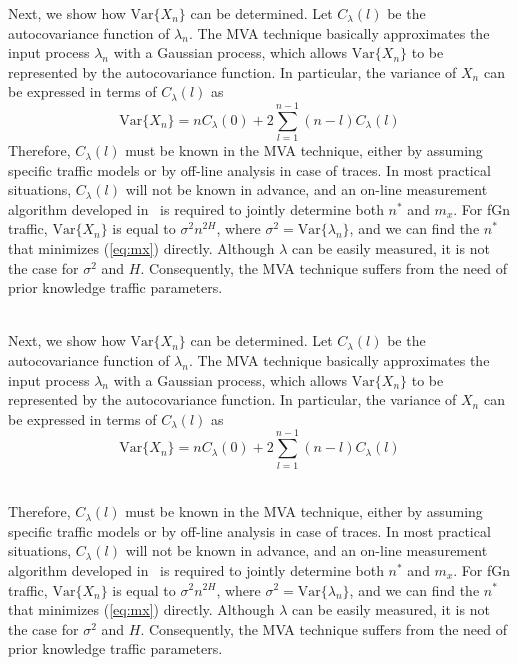 \documentclass[12pt,oneside,openright,a4paper]{cpe-thai-project}
\begin{document}
Next, we show how $\mathrm{Var}\{X_n\}$ can be determined.  Let
$C_{\lambda}(l)$ be the autocovariance function of $\lambda_n$.  The
MVA technique basically approximates the input process $\lambda_n$
with a Gaussian process, which allows $\mathrm{Var}\{X_n\}$ to be
represented by the autocovariance function.  In particular, the
variance of $X_n$ can be expressed in terms of $C_{\lambda}(l)$ as
\begin{equation}
  \mathrm{Var}\{X_n\} = nC_{\lambda}(0) + 2\sum_{l=1}^{n-1} (n-l)C_{\lambda}(l)
\end{equation} 
Therefore, $C_{\lambda}(l)$ must be known in the MVA technique, either
by assuming specific traffic models or by off-line analysis in case of
traces.  In most practical situations, $C_{\lambda}(l)$ will not be
known in advance, and an on-line measurement algorithm developed
in~\cite{eun01} is required to jointly determine both $n^\ast$ and
$m_x$. For fGn traffic, $\mathrm{Var}\{X_n\}$ is equal to $\sigma^2
n^{2H}$, where $\sigma^2 = \mathrm{Var}\{\lambda_n\}$, and we can find
the $n^\ast$ that minimizes (\ref{eq:mx}) directly. Although $\lambda$
can be easily measured, it is not the case for $\sigma^2$ and $H$.
Consequently, the MVA technique suffers from the need of prior
knowledge traffic parameters.


 \\

Next, we show how $\mathrm{Var}\{X_n\}$ can be determined.  Let
$C_{\lambda}(l)$ be the autocovariance function of $\lambda_n$.  The
MVA technique basically approximates the input process $\lambda_n$
with a Gaussian process, which allows $\mathrm{Var}\{X_n\}$ to be
represented by the autocovariance function.  In particular, the
variance of $X_n$ can be expressed in terms of $C_{\lambda}(l)$ as
\begin{equation}
  \mathrm{Var}\{X_n\} = nC_{\lambda}(0) + 2\sum_{l=1}^{n-1} (n-l)C_{\lambda}(l)
\end{equation} 

 \\

Therefore, $C_{\lambda}(l)$ must be known in the MVA technique, either
by assuming specific traffic models or by off-line analysis in case of
traces.  In most practical situations, $C_{\lambda}(l)$ will not be
known in advance, and an on-line measurement algorithm developed
in~\cite{eun01} is required to jointly determine both $n^\ast$ and
$m_x$. For fGn traffic, $\mathrm{Var}\{X_n\}$ is equal to $\sigma^2
n^{2H}$, where $\sigma^2 = \mathrm{Var}\{\lambda_n\}$, and we can find
the $n^\ast$ that minimizes (\ref{eq:mx}) directly. Although $\lambda$
can be easily measured, it is not the case for $\sigma^2$ and $H$.
Consequently, the MVA technique suffers from the need of prior
knowledge traffic parameters. 
\end{document}
